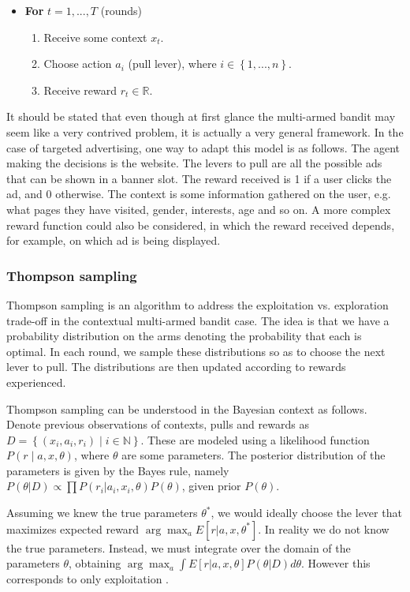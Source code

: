 \documentclass{article} %
\newcommand{\setof}[1]{\ensuremath{\left \{ #1 \right \}}}
\begin{document}
\begin{itemize}
  \item[]
    \textbf{For} $t = 1, ..., T$ (rounds)
    \begin{enumerate}
      \item{Receive some context $x_t$.}
      \item{Choose action  $a_i$ (pull lever), where $i \in \setof{1,...,n}$.}
      \item{Receive reward $r_t \in \mathbb{R}$.}
    \end{enumerate}
\end{itemize}

It should be stated that even though at first glance the multi-armed bandit
may seem like a very contrived problem, it is actually a very general
framework. In the case of targeted advertising, one way to adapt this model
is as follows.  The agent making the decisions is the website. The levers to
pull are all the possible ads that can be shown in a banner slot. The reward
received is 1 if a user clicks the ad, and 0 otherwise. The context is some
information gathered on the user, e.g. what pages they have visited, gender,
interests, age and so on. A more complex reward function could also be
considered, in which the reward received depends, for example, on which ad is
being displayed.

\subsubsection{Thompson sampling}
Thompson sampling \cite{chapelle2011empirical} is an algorithm to address the
exploitation vs. exploration trade-off in the contextual multi-armed bandit
case. The idea is that we have a probability distribution on the arms denoting
the probability that each is optimal. In each round, we sample these
distributions so as to choose the next lever to pull. The distributions are
then updated according to rewards experienced.

Thompson sampling can be understood in the Bayesian context as follows. Denote
previous observations of contexts, pulls and rewards as $D = \setof{(x_i, a_i,
r_i) \;|\; i \in \mathbb{N}}$. These are modeled using a likelihood function
$P(r \;|\; a,x,\theta)$, where $\theta$ are some parameters. The posterior
distribution of the parameters is given by the Bayes rule, namely $P(\theta |
D) \propto \prod P(r_i | a_i, x_i, \theta) P(\theta)$, given prior $P(\theta)$.

Assuming we knew the true parameters $\theta^*$, we would ideally choose the
lever that maximizes expected reward $\arg\max_a E[r | a, x, \theta^*]$. In
reality we do not know the true parameters. Instead, we must integrate over the
domain of the parameters $\theta$, obtaining $\arg\max_a \int E[r | a, x,
\theta] P(\theta|D) d\theta$. However this corresponds to only exploitation
\cite{chapelle2011empirical}.
\end{document}
